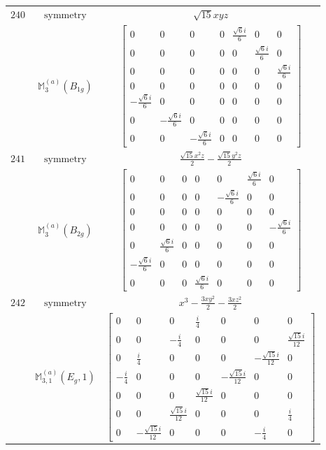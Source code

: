 \documentclass[fleqn,8pt,landscape]{jsarticle}
\begin{document}
\begin{longtable}{ccc}
$ 240 $ & $ \text{symmetry} $ & $ \sqrt{15} x y z $ \\
$  $ & $ \mathbb{M}_{3}^{(a)}(B_{1g}) $ & $ \begin{bmatrix} 0 & 0 & 0 & 0 & \frac{\sqrt{6} i}{6} & 0 & 0 \\ 0 & 0 & 0 & 0 & 0 & \frac{\sqrt{6} i}{6} & 0 \\ 0 & 0 & 0 & 0 & 0 & 0 & \frac{\sqrt{6} i}{6} \\ 0 & 0 & 0 & 0 & 0 & 0 & 0 \\ - \frac{\sqrt{6} i}{6} & 0 & 0 & 0 & 0 & 0 & 0 \\ 0 & - \frac{\sqrt{6} i}{6} & 0 & 0 & 0 & 0 & 0 \\ 0 & 0 & - \frac{\sqrt{6} i}{6} & 0 & 0 & 0 & 0 \end{bmatrix} $ \\ \hline
$ 241 $ & $ \text{symmetry} $ & $ \frac{\sqrt{15} x^{2} z}{2} - \frac{\sqrt{15} y^{2} z}{2} $ \\
$  $ & $ \mathbb{M}_{3}^{(a)}(B_{2g}) $ & $ \begin{bmatrix} 0 & 0 & 0 & 0 & 0 & \frac{\sqrt{6} i}{6} & 0 \\ 0 & 0 & 0 & 0 & - \frac{\sqrt{6} i}{6} & 0 & 0 \\ 0 & 0 & 0 & 0 & 0 & 0 & 0 \\ 0 & 0 & 0 & 0 & 0 & 0 & - \frac{\sqrt{6} i}{6} \\ 0 & \frac{\sqrt{6} i}{6} & 0 & 0 & 0 & 0 & 0 \\ - \frac{\sqrt{6} i}{6} & 0 & 0 & 0 & 0 & 0 & 0 \\ 0 & 0 & 0 & \frac{\sqrt{6} i}{6} & 0 & 0 & 0 \end{bmatrix} $ \\ \hline
$ 242 $ & $ \text{symmetry} $ & $ x^{3} - \frac{3 x y^{2}}{2} - \frac{3 x z^{2}}{2} $ \\
$  $ & $ \mathbb{M}_{3,1}^{(a)}(E_{g},1) $ & $ \begin{bmatrix} 0 & 0 & 0 & \frac{i}{4} & 0 & 0 & 0 \\ 0 & 0 & - \frac{i}{4} & 0 & 0 & 0 & \frac{\sqrt{15} i}{12} \\ 0 & \frac{i}{4} & 0 & 0 & 0 & - \frac{\sqrt{15} i}{12} & 0 \\ - \frac{i}{4} & 0 & 0 & 0 & - \frac{\sqrt{15} i}{12} & 0 & 0 \\ 0 & 0 & 0 & \frac{\sqrt{15} i}{12} & 0 & 0 & 0 \\ 0 & 0 & \frac{\sqrt{15} i}{12} & 0 & 0 & 0 & \frac{i}{4} \\ 0 & - \frac{\sqrt{15} i}{12} & 0 & 0 & 0 & - \frac{i}{4} & 0 \end{bmatrix} $ \\ \hline

\end{longtable}
\end{document}
